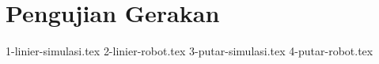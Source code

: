 \section{Pengujian Gerakan}
\label{sec:pengujiangerakan}

\textcolor{red}{\lipsum[1-2]}

{1-linier-simulasi.tex}
{2-linier-robot.tex}
{3-putar-simulasi.tex}
{4-putar-robot.tex}
